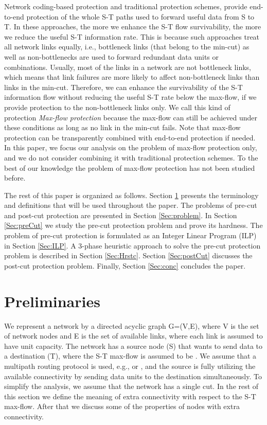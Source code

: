 \documentclass[conference]{IEEEtran}
\begin{document}
Network coding-based protection and traditional protection schemes, provide end-to-end protection of the whole S-T paths used to forward useful data from S to T. In these approaches, the more we enhance the S-T flow survivability, the more we reduce the useful S-T information rate. This is because such approaches treat all network links equally, i.e., bottleneck links (that belong to the min-cut) as well as non-bottlenecks are used to forward redundant data units or combinations. Usually, most of the links in a network are not bottleneck links, which means that link failures are more likely to affect non-bottleneck links than links in the min-cut. Therefore, we can enhance the survivability of the S-T information flow without reducing the useful S-T rate below the max-flow, if we provide protection to the non-bottleneck links only. We call this kind of protection \emph{Max-flow protection} because the max-flow can still be achieved under these conditions as long as no link in the min-cut fails. Note that max-flow protection can be transparently combined with end-to-end protection if needed. In this paper, we focus our analysis on the problem of max-flow protection only, and we do not consider combining it with traditional protection schemes. To the best of our knowledge the problem of max-flow protection has not been studied before. 

The rest of this paper is organized as follows. Section \ref{Sec:prelim} presents the terminology and definitions that will be used throughout the paper. The problems of pre-cut and post-cut protection are presented in Section \ref{Sec:problem}. In Section \ref{Sec:preCut} we study the pre-cut protection problem and prove its hardness. The problem of pre-cut protection is formulated as an Integer Linear Program (ILP) in Section \ref{Sec:ILP}. A 3-phase heuristic approach to solve the pre-cut protection problem is described in Section \ref{Sec:Hrstc}. Section \ref{Sec:postCut} discusses the post-cut protection problem. Finally, Section \ref{Sec:conc} concludes the paper.


\section{Preliminaries}
\label{Sec:prelim}

We represent a network by a directed acyclic graph G=(V,E), where V is the set of network nodes and E is the set of available links, where each link is assumed to have unit capacity. The network has a source node (S) that wants to send data to a destination (T), where the S-T max-flow is assumed to be . We assume that a multipath routing protocol is used, e.g., \cite{SJ01} or \cite{MS01}, and the source is fully utilizing the available connectivity by sending  data units to the destination simultaneously. To simplify the analysis, we assume that the network has a single cut. In the rest of this section we define the meaning of extra connectivity with respect to the S-T max-flow. After that we discuss some of the properties of nodes with extra connectivity.
\end{document}
